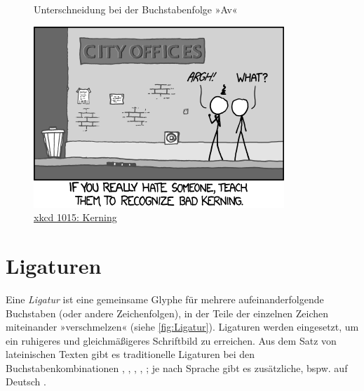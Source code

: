 \begin{figure}
  \centering


  \caption{Unterschneidung bei der Buchstabenfolge »Av«}
  \label{fig:Unterschneidung}
\end{figure}

\begin{figure}
  \centering
  \includegraphics[width=.5\textwidth]{xkcd_Kerning}
  \caption{\href{http://xkcd.com/1015/}{xkcd 1015: Kerning}\protect\footnotemark}
  \label{fig:xkcd_kerning}
\end{figure}

\section{Ligaturen}

Eine \emph{Ligatur} ist eine gemeinsame Glyphe für mehrere
aufeinanderfolgende Buchstaben (oder andere Zeichenfolgen), in der
Teile der einzelnen Zeichen miteinander »verschmelzen« (siehe
\cref{fig:Ligatur}).  Ligaturen werden eingesetzt, um ein ruhigeres
und gleichmäßigeres Schriftbild zu erreichen.  Aus dem Satz von
lateinischen Texten gibt es traditionelle Ligaturen bei den
Buchstabenkombinationen , , , ,
; je nach Sprache gibt es zusätzliche, bspw. auf Deutsch
.

